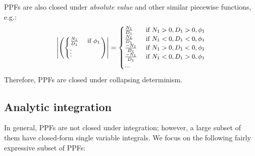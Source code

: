 \documentclass[]{article}
\newcommand{\case}[2]{#2 &\text{ if } #1}%
\begin{document}
PPFs are also closed under \emph{absolute value} and other similar piecewise functions, e.g.:
\begin{equation*}\footnotesize
\left|
\left(
  \begin{cases}
  \case{\phi_1}{\frac{N_1}{D_1}}\\
  \vdots
  \end{cases}
\right)
\right|
=
  \begin{cases}
  \case{N_1>0, D_1>0,\phi_1}{\frac{N_1}{D_1}} \\
\case{N_1<0, D_1<0,\phi_1}{\frac{N_1}{D_1}} \\
\case{N_1>0, D_1<0,\phi_1}{\frac{-N_1}{D_1}} \\
\case{N_1<0, D_1>0,\phi_1}{\frac{-N_1}{D_1}} \\
...
 \end{cases}
\end{equation*}
Therefore, %
PPFs are closed under %
collapsing determinism. %


\subsection{Analytic integration}
In general, PPFs are not closed under integration; however, a large subset of them 
 have closed-form single variable integrals.
We focus on the following fairly expressive  subset of PPFs:
\end{document}
